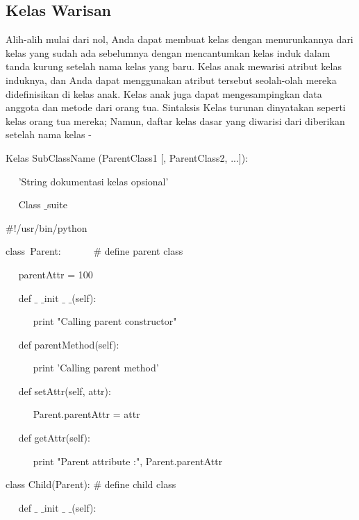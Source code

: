 {\subsection{Kelas Warisan}
Alih-alih mulai dari nol, Anda dapat membuat kelas dengan menurunkannya dari kelas yang sudah ada sebelumnya dengan mencantumkan kelas induk dalam tanda kurung setelah nama kelas yang baru. Kelas anak mewarisi atribut kelas induknya, dan Anda dapat menggunakan atribut tersebut seolah-olah mereka didefinisikan di kelas anak. Kelas anak juga dapat mengesampingkan data anggota dan metode dari orang tua. Sintaksis Kelas turunan dinyatakan seperti kelas orang tua mereka; Namun, daftar kelas dasar yang diwarisi dari diberikan setelah nama kelas - \par
\vspace{12pt}
\noindent 
Kelas SubClassName (ParentClass1 [, ParentClass2, ...]): \par
\noindent 
~~ 'String dokumentasi kelas opsional' \par
\noindent 
~~ Class $  \_  $suite \par
\noindent 
 $  \#  $!/usr/bin/python \par
\vspace{12pt}
\noindent 
class~Parent:~~~~~~   $  \#  $ define parent class \par
\noindent 
~~ parentAttr = 100 \par
\noindent 
~~ def  $  \_  $ $  \_  $init $  \_  $ $  \_  $(self): \par
\noindent 
~~~~~ print "Calling parent constructor" \par
\vspace{12pt}
\noindent 
~~ def parentMethod(self): \par
\noindent 
~~~~~ print 'Calling parent method' \par
\vspace{12pt}
\noindent 
~~ def setAttr(self, attr): \par
\noindent 
~~~~~ Parent.parentAttr = attr \par
\vspace{12pt}
\noindent 
~~ def getAttr(self): \par
\noindent 
~~~~~ print "Parent attribute :", Parent.parentAttr \par
\vspace{12pt}
\noindent 
class Child(Parent):  $  \#  $ define child class \par
\noindent 
~~ def  $  \_  $ $  \_  $init $  \_  $ $  \_  $(self): \par
}
